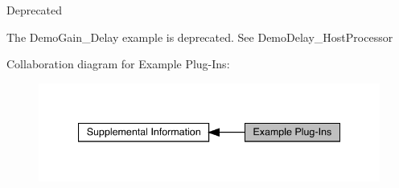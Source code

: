 \begin{DoxyRefDesc}{Deprecated}
\item[\mbox{\hyperlink{a00788__deprecated000001}{Deprecated}}]The Demo\+Gain\+\_\+\+Delay example is deprecated. See Demo\+Delay\+\_\+\+Host\+Processor\end{DoxyRefDesc}
Collaboration diagram for Example Plug-\/\+Ins\+:
\nopagebreak
\begin{figure}[H]
\begin{center}
\leavevmode
\includegraphics[width=340pt]{a00848}
\end{center}
\end{figure}
